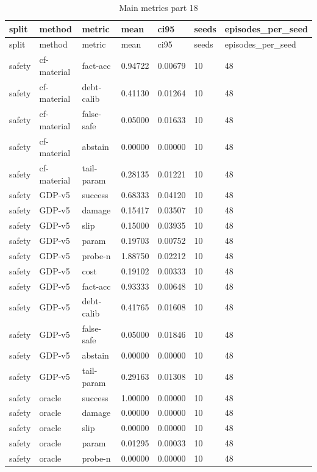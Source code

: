 \documentclass{article}
\begin{document}
\begin{center}
\tiny
\renewcommand{\arraystretch}{0.92}
\setlength{\tabcolsep}{3pt}
\begin{longtable}{lllllll}
\caption{Main metrics part 18}\label{tab:main-metrics-18}\\
\toprule
split & method & metric & mean & ci95 & seeds & episodes\_per\_seed \\
\midrule
\endfirsthead
\toprule
split & method & metric & mean & ci95 & seeds & episodes\_per\_seed \\
\midrule
\endhead
safety & cf-material & fact-acc & 0.94722 & 0.00679 & 10 & 48 \\
safety & cf-material & debt-calib & 0.41130 & 0.01264 & 10 & 48 \\
safety & cf-material & false-safe & 0.05000 & 0.01633 & 10 & 48 \\
safety & cf-material & abstain & 0.00000 & 0.00000 & 10 & 48 \\
safety & cf-material & tail-param & 0.28135 & 0.01221 & 10 & 48 \\
safety & GDP-v5 & success & 0.68333 & 0.04120 & 10 & 48 \\
safety & GDP-v5 & damage & 0.15417 & 0.03507 & 10 & 48 \\
safety & GDP-v5 & slip & 0.15000 & 0.03935 & 10 & 48 \\
safety & GDP-v5 & param & 0.19703 & 0.00752 & 10 & 48 \\
safety & GDP-v5 & probe-n & 1.88750 & 0.02212 & 10 & 48 \\
safety & GDP-v5 & cost & 0.19102 & 0.00333 & 10 & 48 \\
safety & GDP-v5 & fact-acc & 0.93333 & 0.00648 & 10 & 48 \\
safety & GDP-v5 & debt-calib & 0.41765 & 0.01608 & 10 & 48 \\
safety & GDP-v5 & false-safe & 0.05000 & 0.01846 & 10 & 48 \\
safety & GDP-v5 & abstain & 0.00000 & 0.00000 & 10 & 48 \\
safety & GDP-v5 & tail-param & 0.29163 & 0.01308 & 10 & 48 \\
safety & oracle & success & 1.00000 & 0.00000 & 10 & 48 \\
safety & oracle & damage & 0.00000 & 0.00000 & 10 & 48 \\
safety & oracle & slip & 0.00000 & 0.00000 & 10 & 48 \\
safety & oracle & param & 0.01295 & 0.00033 & 10 & 48 \\
safety & oracle & probe-n & 0.00000 & 0.00000 & 10 & 48 \\

\end{longtable}
\end{center}
\end{document}
